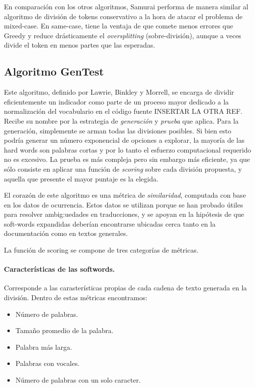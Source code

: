 En comparación con los otros algoritmos, Samurai performa de manera similar al algoritmo de división de tokens conservativo a la hora de atacar el problema de mixed-case.
En same-case, tiene la ventaja de que comete menos errores que Greedy y reduce drásticamente el \textit{oversplitting} (sobre-división), aunque a veces divide el token en menos partes que las esperadas.

\subsection{Algoritmo GenTest}
Este algoritmo, definido por Lawrie, Binkley y Morrell, se encarga de dividir eficientemente un indicador como parte de un proceso mayor dedicado a la normalización del vocabulario en el código fuente \cite{LawrieBinkleyMorrell2010} INSERTAR LA OTRA REF.
Recibe su nombre por la estrategia de \textit{generación} y \textit{prueba} que aplica.
Para la generación, simplemente se arman todas las divisiones posibles.
Si bien esto podría generar un número exponencial de opciones a explorar, la mayoría de las hard words son palabras cortas y por lo tanto el esfuerzo computacional requerido no es excesivo.
La prueba es más compleja pero sin embargo más eficiente, ya que sólo consiste en aplicar una función de \textit{scoring} sobre cada división propuesta, y aquella que presente el mayor puntaje es la elegida.

El corazón de este algoritmo es una métrica de \textit{similaridad}, computada con base en los datos de ocurrencia.
Estos datos se utilizan porque se han probado útiles para resolver ambig:uedades en traducciones, y se apoyan en la hipótesis de que soft-words expandidas deberían encontrarse ubicadas cerca tanto en la documentación como en textos generales.

La función de scoring se compone de tres categorías de métricas.
\paragraph{Características de las softwords.}
Corresponde a las carasterísticas propias de cada cadena de texto generada en la división.
Dentro de estas métricas encontramos:
\begin{itemize}
  \item Número de palabras.
  \item Tamaño promedio de la palabra.
  \item Palabra más larga.
  \item Palabras con vocales.
  \item Número de palabras con un solo caracter.
\end{itemize}

